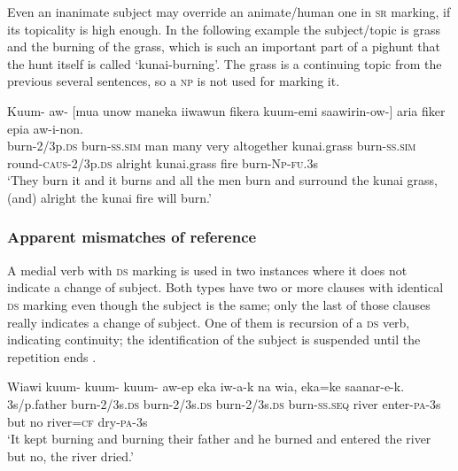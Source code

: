 Even an inanimate subject may override an animate/human one in \textsc{sr} marking, if its topicality is high enough. In the following example the subject/topic is  grass and the burning of the grass, which is such an important part of a pighunt that the hunt itself is called  `kunai-burning'.  The grass is a continuing topic from the previous several sentences, so a \textsc{np} is not used for marking it. 

\ea%
\label{ex:8:x1479}
\gll Kuum-  aw-  [mua  unow  maneka  iiwawun  fikera kuum-emi  saawirin-ow-]  aria  fiker  epia aw-i-non.\\
burn-2/3p.\textsc{ds}  burn-\textsc{ss}.\textsc{sim} man many very altogether kunai.grass burn-\textsc{ss}.\textsc{sim} round-\textsc{caus}-2/3p.\textsc{ds} alright  kunai.grass  fire burn-\textsc{Np}-\textsc{fu}.3s\\
\glt`They burn it and it burns and all the men burn and surround the kunai grass, (and) alright the kunai fire will burn.'
\z


\subsubsection{Apparent mismatches of reference}

A medial verb with \textsc{ds} marking is used in two instances where it does not indicate a change of subject. Both types have two or more clauses with identical \textsc{ds} marking even though the subject is the same; only the last of those clauses really indicates a change of subject. One of them is recursion of a \textsc{ds} verb, indicating continuity; the identification of the subject is suspended until the repetition ends \citep[201]{Reesink1987}. 

\ea%
\label{ex:8:x1493}
\gll Wiawi  kuum-  kuum-  kuum-  aw-ep eka  iw-a-k  na  wia,  eka=ke  saanar-e-k. \\
3s/p.father burn-2/3s.\textsc{ds} burn-2/3s.\textsc{ds} burn-2/3s.\textsc{ds} burn-\textsc{ss}.\textsc{seq} river enter-\textsc{pa}-3s but no river=\textsc{cf} dry-\textsc{pa}-3s\\
\glt`It kept burning and burning their father and he burned and entered the river but no, the river dried.'
\z


